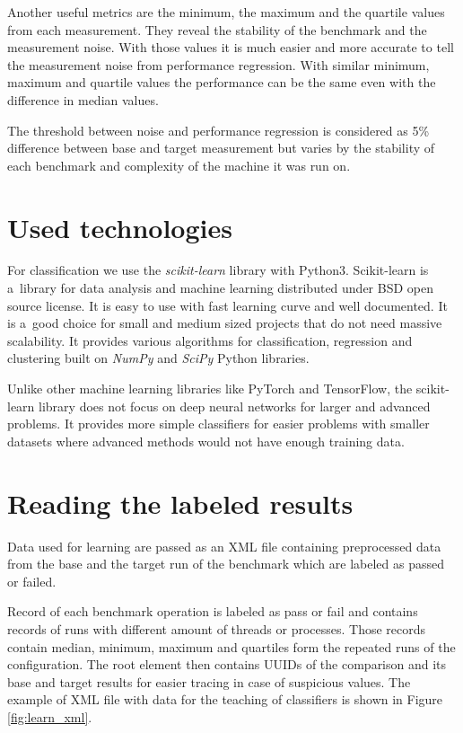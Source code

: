 Another useful metrics are the minimum, the maximum and the quartile values from each
measurement. They reveal the stability of the benchmark and the measurement
noise. With those values it is much easier and more accurate to tell the
measurement noise from performance regression. With similar minimum, maximum and
quartile values the performance can be the same even with the difference in median values.

The threshold between noise and performance regression is considered as 5\%
difference between base and target measurement but varies by the stability of
each benchmark and complexity of the machine it was run on.

\section{Used technologies}
For classification we use the \emph{scikit-learn} library\;\cite{scikit-learn} with
Python3. Scikit-learn is a~library for data analysis and machine learning
distributed under BSD open source license. It is easy to use with fast learning curve and
well documented. It is a~good choice for small and medium sized projects that do
not need massive scalability. It provides various algorithms for classification,
regression and clustering built on \emph{NumPy} and \emph{SciPy} Python
libraries.

Unlike other machine learning libraries like PyTorch and TensorFlow, the
scikit-learn library does not focus on deep neural networks for larger and
advanced problems. It provides more simple classifiers for easier problems
with smaller datasets where advanced methods would not have enough training
data.

\section{Reading the labeled results} \label{sec:learn_xml}
Data used for learning are passed as an XML file containing preprocessed data from
the base and the target run of the benchmark which are labeled as passed or failed.

Record of each benchmark operation is labeled as pass or fail and contains
records of runs with different amount of threads or processes. Those records
contain median, minimum, maximum and quartiles form the repeated runs of the
configuration. The root element then contains UUIDs of the comparison and its base
and target results for easier tracing in case of suspicious values.
The example of XML file with data for the teaching of classifiers is shown in Figure
\ref{fig:learn_xml}.

